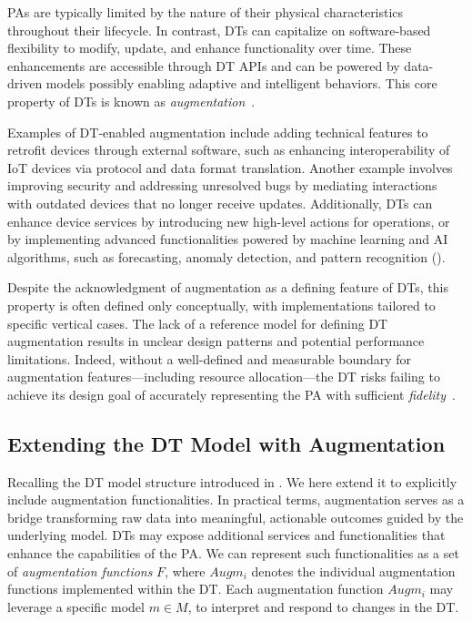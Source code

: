 \acp{PA} are typically limited by the nature of their physical characteristics throughout their lifecycle. In contrast, \acp{DT} can capitalize on software-based flexibility to modify, update, and enhance functionality over time.
These enhancements are accessible through \ac{DT} \acp{API} and can be powered by data-driven models possibly enabling adaptive and intelligent behaviors.
This core property of \acp{DT} is known as \emph{augmentation}~\cite{dt-IoT-context-Minerva-2020}.

Examples of DT-enabled augmentation include adding technical features to retrofit devices through external software, such as enhancing interoperability of \ac{IoT} devices via protocol and data format translation. Another example involves improving security and addressing unresolved bugs by mediating interactions with outdated devices that no longer receive updates. Additionally, \acp{DT} can enhance device services by introducing new high-level actions for operations, or by implementing advanced functionalities powered by machine learning and \ac{AI} algorithms, such as forecasting, anomaly detection, and pattern recognition ().

Despite the acknowledgment of augmentation as a defining feature of \acp{DT},
this property is often defined only conceptually, with implementations tailored to specific vertical cases.
The lack of a reference model for defining \ac{DT} augmentation results in unclear design patterns and potential performance limitations.
Indeed, without a well-defined and measurable boundary for augmentation features---including resource allocation---the \ac{DT} risks failing to achieve its design goal of accurately representing the \ac{PA} with sufficient \emph{fidelity}~\cite{Bellavista_Bicocchi_Fogli_Giannelli_Mamei_Picone_2023}.

\subsection{Extending the DT Model with Augmentation}

Recalling the \ac{DT} model structure introduced in . 
We here extend it to explicitly include augmentation functionalities.
%
In practical terms, augmentation serves as a bridge transforming raw data into meaningful, actionable outcomes guided by the underlying model.
\acp{DT} may expose additional services and functionalities that enhance the capabilities of the \ac{PA}.
We can represent such functionalities as a set of \emph{augmentation functions} $F$, where $Augm_{i}$ denotes the individual augmentation functions implemented within the DT. Each augmentation function $Augm_i$ may leverage a specific model $m \in M$, to interpret and respond to changes in the DT.

